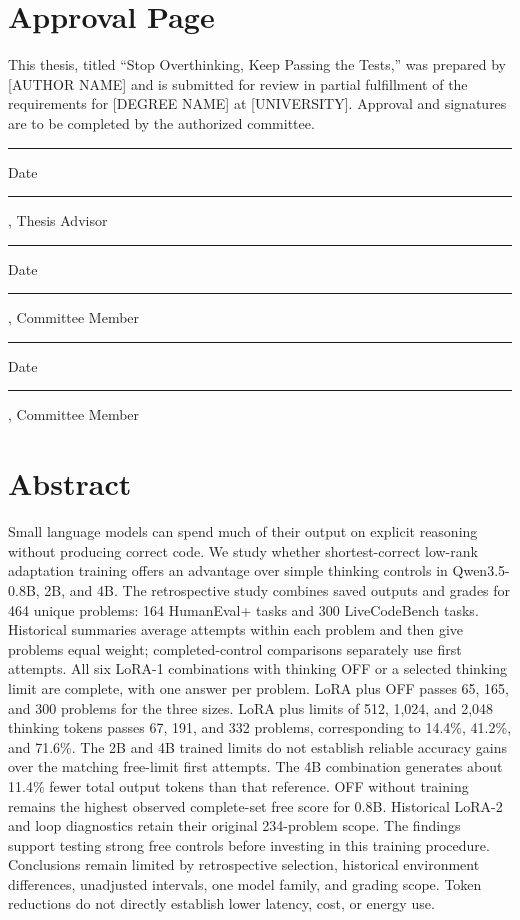 \documentclass[11pt,letterpaper]{article}
\begin{document}
\section*{Approval Page}
This thesis, titled ``Stop Overthinking, Keep Passing the Tests,'' was prepared by [AUTHOR NAME] and is submitted for review in partial fulfillment of the requirements for [DEGREE NAME] at [UNIVERSITY]. Approval and signatures are to be completed by the authorized committee.
\vspace{0.5in}\par\noindent\rule{2.8in}{0.4pt}\quad Date \rule{1in}{0.4pt}\par [SUPERVISOR NAME], Thesis Advisor
\vspace{0.5in}\par\noindent\rule{2.8in}{0.4pt}\quad Date \rule{1in}{0.4pt}\par [COMMITTEE MEMBER NAME], Committee Member
\vspace{0.5in}\par\noindent\rule{2.8in}{0.4pt}\quad Date \rule{1in}{0.4pt}\par [COMMITTEE MEMBER NAME], Committee Member
\clearpage\section*{Abstract}
Small language models can spend much of their output on explicit reasoning without producing correct code. We study whether shortest-correct low-rank adaptation training offers an advantage over simple thinking controls in Qwen3.5-0.8B, 2B, and 4B. The retrospective study combines saved outputs and grades for 464 unique problems: 164 HumanEval+ tasks and 300 LiveCodeBench tasks. Historical summaries average attempts within each problem and then give problems equal weight; completed-control comparisons separately use first attempts. All six LoRA-1 combinations with thinking OFF or a selected thinking limit are complete, with one answer per problem. LoRA plus OFF passes 65, 165, and 300 problems for the three sizes. LoRA plus limits of 512, 1,024, and 2,048 thinking tokens passes 67, 191, and 332 problems, corresponding to 14.4\%, 41.2\%, and 71.6\%. The 2B and 4B trained limits do not establish reliable accuracy gains over the matching free-limit first attempts. The 4B combination generates about 11.4\% fewer total output tokens than that reference. OFF without training remains the highest observed complete-set free score for 0.8B. Historical LoRA-2 and loop diagnostics retain their original 234-problem scope. The findings support testing strong free controls before investing in this training procedure. Conclusions remain limited by retrospective selection, historical environment differences, unadjusted intervals, one model family, and grading scope. Token reductions do not directly establish lower latency, cost, or energy use.
\end{document}
